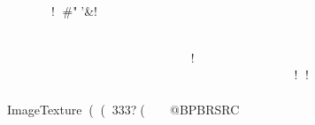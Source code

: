 
				              





								! #"'&!				
			


				         		    ! 		           ! ! 		   %
   ImageTexture       (             (                 333?   (                         
     @B  PBRSRC